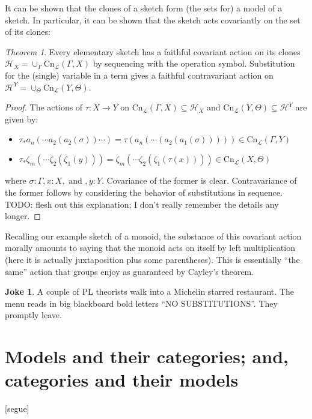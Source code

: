 \documentclass[12pt,twoside]{reedthesis}
\theoremstyle{definition}
\newtheorem{joke}{Joke}
\theoremstyle{remark}
\theoremstyle{theorem}
\newtheorem{theorem}{Theorem}
\begin{document}
  It can be shown that the clones of a sketch form (the sets for) a model of a sketch. In particular, it can be shown that the sketch acts covariantly on the set of its clones:
  \begin{theorem}
    Every elementary sketch has a faithful covariant action on its clones
    \(\mathcal{H}_{X} = \cup_{\Gamma} \text{Cn}_{\mathcal{L}}(\Gamma,X)\) by
    sequencing with the operation symbol. Substitution for the (single)
    variable in a term gives a faithful contravariant action on
    \(\mathcal{H}^{Y} = \cup_{\Theta} \text{Cn}_{\mathcal{L}}(Y,\Theta)\).
  \end{theorem}
  \begin{proof}
    The actions of \(\tau : X \rightarrow Y\) on \(\text{Cn}_\mathcal{L}(\Gamma,X) \subseteq \mathcal{H}_{X}\) and \(\text{Cn}_\mathcal{L}(Y,\Theta) \subseteq \mathcal{H}^{Y}\) are given by:
    \begin{itemize}
      \item \(\tau_{*}a_{n}(\cdots a_{2}(a_{2}(\sigma))\cdots) = \tau(a_{n}(\cdots(a_{2}(a_{1}(\sigma))))) \in \text{Cn}_{\mathcal{L}}(\Gamma,Y)\)
      \item \(\tau_{*}\zeta_{m}(\cdots \zeta_{2}(\zeta_{1}(y))) = \zeta_{m}(\cdots\zeta_{2}(\zeta_{1}(\tau(x)))) \in \text{Cn}_{\mathcal{L}}(X,\Theta)\)
    \end{itemize}
    where \(\sigma : \Gamma, x : X, \text { and }, y:Y\). Covariance of the former is
    clear. Contravariance of the former follows by considering the behavior of
    substitutions in sequence. TODO: flesh out this explanation; I don't really
    remember the details any longer.
  \end{proof}

  Recalling our example sketch of a monoid, the substance of this covariant
  action morally amounts to saying that the monoid acts on itself by left
  multiplication (here it is actually juxtaposition plus some parentheses). This
  is essentially ``the same'' action that groups enjoy as guaranteed by Cayley's
  theorem.

  \begin{joke}
    A couple of PL theorists walk into a Michelin starred restaurant. The menu
    reads in big blackboard bold letters ``NO SUBSTITUTIONS''. They promptly
    leave.
  \end{joke}

\section{Models and their categories; and, categories and their models}
[segue]
\end{document}
